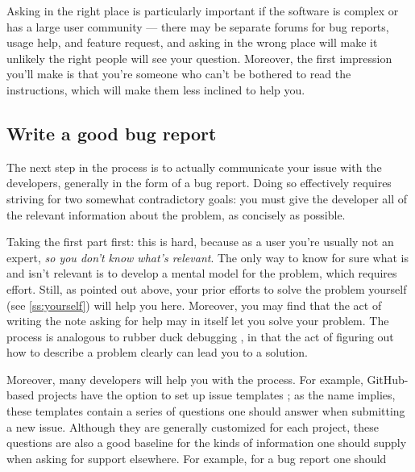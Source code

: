 \documentclass[9pt,training]{livecoms}
\begin{document}
Asking in the right place is particularly important if the software is complex
or has a large user community --- there may be separate forums for bug reports,
usage help, and feature request, and asking in the wrong place will make it
unlikely the right people will see your question. Moreover, the first impression
you'll make is that you're someone who can't be bothered to read the
instructions, which will make them less inclined to help you.

\subsection{Write a good bug report}

The next step in the process is to actually communicate your issue with the
developers, generally in the form of a bug report.  Doing so effectively
requires striving for two somewhat contradictory goals: you must give the
developer all of the relevant information about the problem, as concisely as
possible.

Taking the first part first: this is hard, because as a user you're usually not
an expert, \emph{so you don't know what's relevant}. The only way to know for
sure what is and isn't relevant is to develop a mental model for the problem,
which requires effort. Still, as pointed out above, your prior efforts to solve
the problem yourself (see \ref{ss:yourself}) will help you here.  Moreover, you
may find that the act of writing the note asking for help may in itself let you
solve your problem. The process is analogous to rubber duck debugging
\cite{Thomas-1999}, in that the act of figuring out how to describe a problem
clearly can lead you to a solution.

Moreover, many developers will help you with the process. For example,
GitHub-based projects have the option to set up issue templates
\cite{github-templates}; as the name implies, these templates contain a series
of questions one should answer when submitting a new issue. Although they are
generally customized for each project, these questions are also a good baseline
for the kinds of information one should supply when asking for support
elsewhere. For example, for a bug report one should
\end{document}
